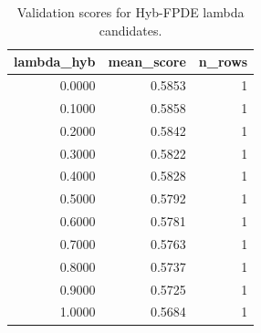 \begin{table}[t]
\caption{Validation scores for Hyb-FPDE lambda candidates.}
\label{tab:lambda_distribution_computed}
\centering
\begin{tabular}{rrr}
\toprule
lambda\_hyb & mean\_score & n\_rows \\
\midrule
0.0000 & 0.5853 & 1 \\
0.1000 & 0.5858 & 1 \\
0.2000 & 0.5842 & 1 \\
0.3000 & 0.5822 & 1 \\
0.4000 & 0.5828 & 1 \\
0.5000 & 0.5792 & 1 \\
0.6000 & 0.5781 & 1 \\
0.7000 & 0.5763 & 1 \\
0.8000 & 0.5737 & 1 \\
0.9000 & 0.5725 & 1 \\
1.0000 & 0.5684 & 1 \\
\bottomrule
\end{tabular}

\end{table}
